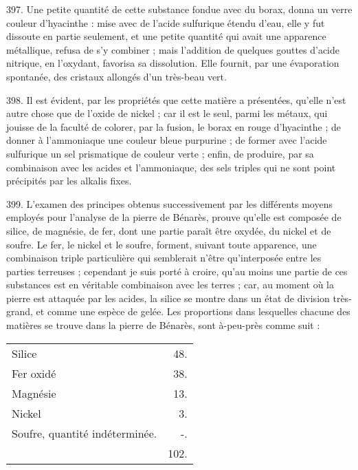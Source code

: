 \documentclass[a4paper, 11pt, oneside, polutonikogreek, french]{article}
\begin{document}
397. Une petite quantité de cette substance fondue avec du borax, donna un verre couleur d'hyacinthe : mise avec de l'acide sulfurique étendu d'eau, elle y fut dissoute en partie seulement, et une petite quantité qui avait une apparence métallique, refusa de s'y combiner ; mais l'addition de quelques gouttes d'acide nitrique, en l'oxydant, favorisa sa dissolution. Elle fournit, par une évaporation spontanée, des cristaux allongés d'un très-beau vert.

398. Il est évident, par les propriétés que cette matière a présentées, qu'elle n'est autre chose que de l'oxide de nickel ; car il est le seul, parmi les métaux, qui jouisse de la faculté de colorer, par la fusion, le borax en rouge d'hyacinthe ; de donner à l'ammoniaque une couleur bleue purpurine ; de former avec l'acide sulfurique un sel prismatique de couleur verte ; enfin, de produire, par sa combinaison avec les acides et l'ammoniaque, des sels triples qui ne sont point précipités par les alkalis fixes.

399. L'examen des principes obtenus successivement par les différents moyens employés pour l'analyse de la pierre de Bénarès, prouve qu'elle est composée de silice, de magnésie, de fer, dont une partie paraît être oxydée, du nickel et de soufre. Le fer, le nickel et le soufre, forment, suivant toute apparence, une combinaison triple particulière qui semblerait n'être qu'interposée entre les parties terreuses ; cependant je suis porté à croire, qu'au moins une partie de ces substances est en véritable combinaison avec les terres ; car, au moment où la pierre est attaquée par les acides, la silice se montre dans un état de division très-grand, et comme une espèce de gelée. Les proportions dans lesquelles chacune des matières se trouve dans la pierre de Bénarès, sont à-peu-près comme suit :

\begin{table}[!ht]
    \centering
    \Fontauri
    \Large
    \begin{tabular}{l r}
        Silice & 48. \\
        Fer oxidé & 38. \\
        Magnésie & 13. \\
        Nickel & 3. \\
        Soufre, quantité indéterminée. & -. \\ \hline
        ~ & 102. \\
    \end{tabular}
\end{table}
\end{document}
